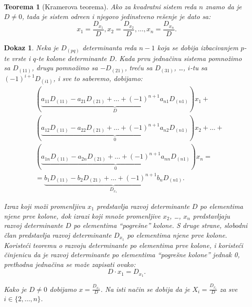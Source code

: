 \documentclass[11pt]{article}
\theoremstyle{masulthm}
\newtheorem{theorem}{Teorema}[section]
\theoremstyle{masuldef}
\theoremstyle{masulexmp}
\theoremstyle{masulproof}
\newtheorem*{masulproof}{Dokaz}
\begin{document}
\begin{theorem}[Kramerova teorema]
Ako za kvadratni sistem reda $ n $ znamo da je $ D \ne 0 $,
tada je sistem odre\dj en i njegovo jedinstveno rešenje je dato sa:
\begin{equation*}
    x_1 = \frac{D_{x_1}}{D},
    x_2 = \frac{D_{x_2}}{D},
    \dots,
    x_n = \frac{D_{x_n}}{D}.
\end{equation*}

\end{theorem}

\noindent
\begin{masulproof}
  Neka je $ D_{(pq)} $ determinanta reda $ n - 1 $ koja se dobija izbacivanjem
  $ p $-te vrste i $ q $-te kolone determinante $ D $.
  Kada prvu jednačinu sistema pomnožimo sa $ D_{(11)} $, drugu pomnožimo sa
  $ -D_{(21)} $, treću sa $ D_{(31)} $, \dots, $ i $-tu sa
  $ (-1)^{i+1} D_{(i1)} $, i sve to saberemo, dobijamo:
  \begin{align*}
      & (\underbrace{a_{11} D_{(11)} - a_{21} D_{(21)} + \ldots + (-1)^{n+1} a_{n1} D_{(n1)}}_D) x_1 + \\
      & (\underbrace{a_{12} D_{(11)} - a_{22} D_{(21)} + \ldots + (-1)^{n+1} a_{n2} D_{(n1)}}_0) x_2 + \ldots + \\
      & (\underbrace{a_{1n} D_{(11)} - a_{2n} D_{(21)} + \ldots + (-1)^{n+1} a_{nn} D_{(n1)}}_0) x_n = \\
      & = \underbrace{b_1 D_{(11)} - b_2 D_{(21)} + \ldots + (-1)^{n+1} b_n D_{(n1)}}_{D_{x_1}} .
  \end{align*}
  
  \noindent
  Izraz koji moži promenljivu $ x_1 $ predstavlja razvoj determinante $ D $
  po elementima njene prve kolone, dok izrazi koji množe promenljive $ x_2 $, \dots, $ x_n $ predstavljaju razvoj determinante $ D $ po elementima ``pogrešne'' kolone.
  S druge strane, slobodni član predstavlja razvoj determinante $ D_{x_1} $ po elementima njene prve kolone.
  Koristeći teoremu o razvoju determinante po elementima prve kolone, i koristeći činjenicu da je
  razvoj determinante po elementima ``pogrešne kolone'' jednak 0, prethodna jednačina se može
  zapisati ovako:
  \begin{equation*}
      D \cdot x_1 = D_{x_1}.
  \end{equation*}
  
  \noindent
  Kako je $ D \ne 0 $ dobijamo $ x = \frac{D_{x_1}}{D} $. Na isti način se dobija da je
  $ X_i = \frac{D_{x_i}}{D} $ za sve $ i \in \{2, \dots, n\} $.
\end{masulproof}
\end{document}
